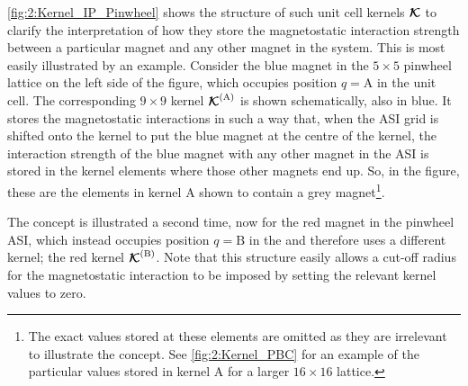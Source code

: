 
\cref{fig:2:Kernel_IP_Pinwheel} shows the structure of such unit cell kernels $\boldsymbol{\mathbf{\mathcal{K}}}$ to clarify the interpretation of how they store the magnetostatic interaction strength between a particular magnet and any other magnet in the system.
This is most easily illustrated by an example.
Consider the blue magnet in the $5 \times 5$ pinwheel lattice on the left side of the figure, which occupies position $q=\mathrm{A}$ in the unit cell.
The corresponding $9 \times 9$ kernel $\boldsymbol{\mathbf{\mathcal{K}}}^\mathrm{(A)}$ is shown schematically, also in blue.
It stores the magnetostatic interactions in such a way that, when the ASI grid is shifted onto the kernel to put the blue magnet at the centre of the kernel, the interaction strength of the blue magnet with any other magnet in the ASI is stored in the kernel elements where those other magnets end up.
So, in the figure, these are the elements in kernel A shown to contain a grey magnet\footnote{
	The exact values stored at these elements are omitted as they are irrelevant to illustrate the concept. See \cref{fig:2:Kernel_PBC} for an example of the particular values stored in kernel A for a larger $16 \times 16$ lattice.
}. \par
The concept is illustrated a second time, now for the red magnet in the pinwheel ASI, which instead occupies position $q=\mathrm{B}$ in the  and therefore uses a different kernel; the red kernel $\boldsymbol{\mathbf{\mathcal{K}}}^\mathrm{(B)}$.
Note that this structure easily allows a cut-off radius for the magnetostatic interaction to be imposed by setting the relevant kernel values to zero. \\\par

